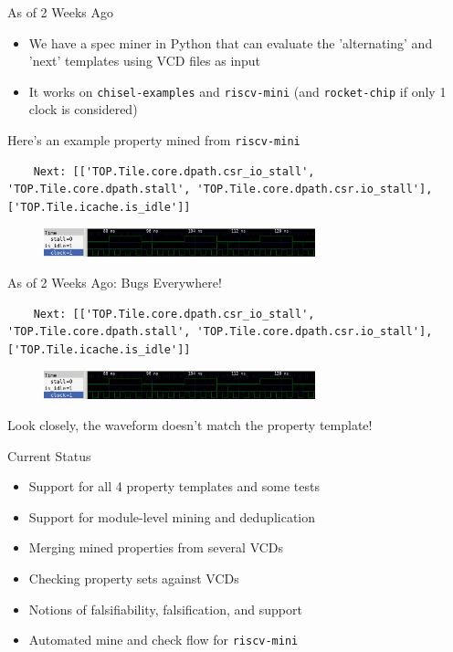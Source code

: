\documentclass[12pt,aspectratio=169]{beamer}
\begin{document}
\begin{frame}[fragile]{As of 2 Weeks Ago}
  \begin{itemize}
    \item {We have a spec miner in Python that can evaluate the 'alternating' and 'next' templates using VCD files as input}
    \item {It works on \texttt{chisel-examples} and \texttt{riscv-mini} (and \texttt{rocket-chip} if only 1 clock is considered)}
  \end{itemize}
  {Here's an example property mined from \texttt{riscv-mini}}
  \begin{verbatim}
    Next: [['TOP.Tile.core.dpath.csr_io_stall', 'TOP.Tile.core.dpath.stall', 'TOP.Tile.core.dpath.csr.io_stall'], ['TOP.Tile.icache.is_idle']]
  \end{verbatim}

  \begin{figure}
    \centering
    \includegraphics[width=0.7\textwidth]{waveform.png}
  \end{figure}
\end{frame}

\begin{frame}[fragile]{As of 2 Weeks Ago: Bugs Everywhere!}
  \begin{verbatim}
    Next: [['TOP.Tile.core.dpath.csr_io_stall', 'TOP.Tile.core.dpath.stall', 'TOP.Tile.core.dpath.csr.io_stall'], ['TOP.Tile.icache.is_idle']]
  \end{verbatim}

  \begin{figure}
    \centering
    \includegraphics[width=0.7\textwidth]{waveform.png}
  \end{figure}

  Look closely, the waveform doesn't match the property template!
\end{frame}

\begin{frame}{Current Status}
  \begin{itemize}
    \item Support for all 4 property templates and some tests
    \item Support for module-level mining and deduplication
    \item Merging mined properties from several VCDs
    \item Checking property sets against VCDs
    \item Notions of falsifiability, falsification, and support
    \item Automated mine and check flow for \texttt{riscv-mini}
  \end{itemize}
\end{frame}
\end{document}
